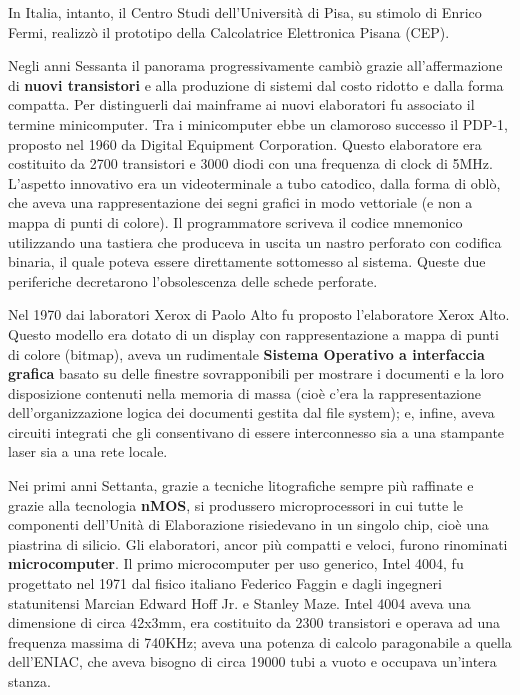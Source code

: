 \documentclass[12pt]{article}
\begin{document}
In Italia, intanto, il Centro Studi dell’Università di Pisa, su stimolo di Enrico Fermi, realizzò il prototipo della Calcolatrice Elettronica Pisana (CEP).\par\medskip\noindent
 Negli anni Sessanta il panorama progressivamente cambiò grazie all’affermazione di \textbf{nuovi transistori} e alla produzione di sistemi dal costo ridotto e dalla forma compatta. Per distinguerli dai mainframe ai nuovi elaboratori fu associato il termine minicomputer. Tra i minicomputer ebbe un clamoroso successo il PDP-1, proposto nel 1960 da Digital Equipment Corporation. Questo elaboratore era costituito da 2700 transistori e 3000 diodi con una frequenza di clock di 5MHz. L’aspetto innovativo era un videoterminale a tubo catodico, dalla forma di oblò, che aveva una rappresentazione dei segni grafici in modo vettoriale (e non a mappa di punti di colore). Il programmatore scriveva il codice mnemonico utilizzando una tastiera che produceva in uscita un nastro perforato con codifica binaria, il quale poteva essere direttamente sottomesso al sistema. Queste due periferiche decretarono l’obsolescenza delle schede perforate. \par\medskip\noindent
Nel 1970 dai laboratori Xerox di Paolo Alto fu proposto l’elaboratore Xerox Alto. Questo modello era dotato di un display con rappresentazione a mappa di punti di colore (bitmap), aveva un rudimentale \textbf{Sistema Operativo a interfaccia grafica} basato su delle finestre sovrapponibili per mostrare i documenti e la loro disposizione contenuti nella memoria di massa (cioè c’era la rappresentazione dell’organizzazione logica dei documenti gestita dal file system); e, infine, aveva circuiti integrati che gli consentivano di essere interconnesso sia a una stampante laser sia a una rete locale.\par\medskip\noindent
Nei primi anni Settanta, grazie a tecniche litografiche sempre più raffinate e grazie alla tecnologia \textbf{nMOS}, si produssero microprocessori in cui tutte le componenti dell’Unità di Elaborazione risiedevano in un singolo chip, cioè una piastrina di silicio. Gli elaboratori, ancor più compatti e veloci, furono rinominati \textbf{microcomputer}. Il primo microcomputer per uso generico, Intel 4004, fu progettato nel 1971 dal fisico italiano Federico Faggin e dagli ingegneri statunitensi Marcian Edward Hoff Jr. e Stanley Maze.  Intel 4004 aveva una dimensione di circa 42x3mm, era costituito da 2300 transistori e operava ad una frequenza massima di 740KHz; aveva una potenza di calcolo paragonabile a quella dell’ENIAC, che aveva bisogno di circa 19000 tubi a vuoto e occupava un’intera stanza.\par\medskip\noindent
\end{document}
